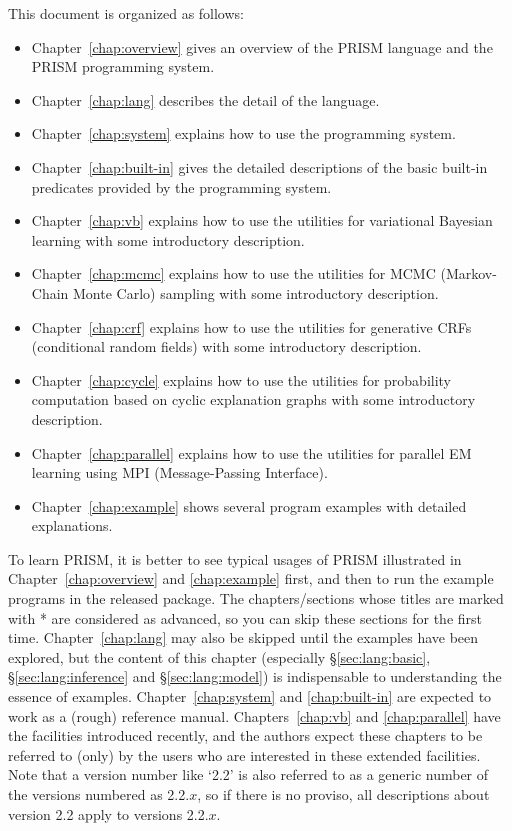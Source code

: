 \documentclass[a4paper]{report}
\newcommand{\secref}[1]{\S\ref{#1}}
\begin{document}
This document is organized as follows:
\begin{itemize}
\item
  Chapter~\ref{chap:overview} gives an overview of the PRISM language
  and the PRISM programming system.
\item
  Chapter~\ref{chap:lang} describes the detail of the language.
\item
  Chapter~\ref{chap:system} explains how to use the programming system.
\item
  Chapter~\ref{chap:built-in} gives the detailed descriptions of
  the basic built-in predicates provided by the programming system.
\item
  Chapter~\ref{chap:vb} explains how to use the utilities for
  variational Bayesian learning with some introductory description.
\item
  Chapter~\ref{chap:mcmc} explains how to use the utilities for
  MCMC (Markov-Chain Monte Carlo) sampling
  with some introductory description.
\item
  Chapter~\ref{chap:crf} explains how to use the utilities for
  generative CRFs (conditional random fields)
  with some introductory description.
\item
  Chapter~\ref{chap:cycle} explains how to use the utilities for
  probability computation based on cyclic explanation graphs
  with some introductory description.
\item
  Chapter~\ref{chap:parallel} explains how to use the utilities for
  parallel EM learning using MPI (Message-Passing Interface).
\item
  Chapter~\ref{chap:example} shows several program examples with detailed
  explanations.
\end{itemize}
To learn PRISM, it is better to see typical usages of PRISM illustrated
in Chapter~\ref{chap:overview} and \ref{chap:example} first, and then to
run the example programs in the released package.    The chapters/sections
whose titles are marked with * are considered as advanced, so you can
skip these sections for the first time.  Chapter~\ref{chap:lang} may
also be skipped until the examples have been explored, but the content
of this chapter (especially \secref{sec:lang:basic},
\secref{sec:lang:inference} and \secref{sec:lang:model})
is indispensable to understanding the essence of examples.
Chapter~\ref{chap:system} and \ref{chap:built-in} are expected to work as
a (rough) reference manual.  Chapters~\ref{chap:vb} and \ref{chap:parallel}
have the facilities introduced recently, and the authors
expect these chapters to be referred to (only) by the users who are
interested in these extended facilities.  Note that a version number like
`2.2' is also referred to as a generic number of the versions numbered as
2.2.$x$, so if there is no proviso, all descriptions about version 2.2
apply to versions 2.2.$x$.
\end{document}
